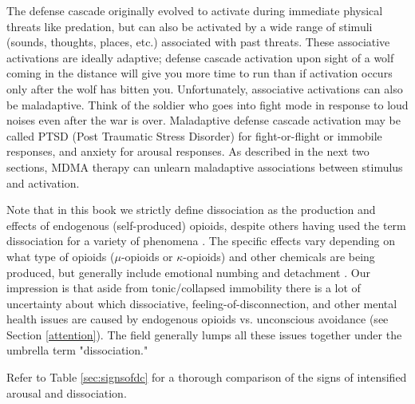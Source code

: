 \documentclass[12pt,letterpaper]{book}
\begin{document}
The defense cascade originally evolved to activate during immediate physical threats like predation, but can also be activated by a wide range of stimuli (sounds, thoughts, places, etc.) associated with past threats. These associative activations are ideally adaptive; defense cascade activation upon sight of a wolf coming in the distance will give you more time to run than if activation occurs only after the wolf has bitten you. Unfortunately, associative activations can also be maladaptive. Think of the soldier who goes into fight mode in response to loud noises even after the war is over. Maladaptive defense cascade activation may be called PTSD (Post Traumatic Stress Disorder) for fight-or-flight or immobile responses, and anxiety for arousal responses. As described in the next two sections, MDMA therapy can unlearn maladaptive associations between stimulus and activation.

Note that in this book we strictly define dissociation as the production and effects of endogenous (self-produced) opioids, despite others having used the term dissociation for a variety of phenomena \cite{kozlowskaDefenseCascade}. The specific effects vary depending on what type of opioids ($\mu$-opioids or $\kappa$-opioids) and other chemicals are being produced, but generally include emotional numbing and detachment \cite{kozlowskaDefenseCascade,lanius2018review}. Our impression is that aside from tonic/collapsed immobility there is a lot of uncertainty about which dissociative, feeling-of-disconnection, and other mental health issues are caused by endogenous opioids vs. unconscious avoidance (see Section \ref{attention}). The field generally lumps all these issues together under the umbrella term "dissociation."

Refer to Table \ref{sec:signsofdc} for a thorough comparison of the signs of intensified arousal and dissociation.
\end{document}
